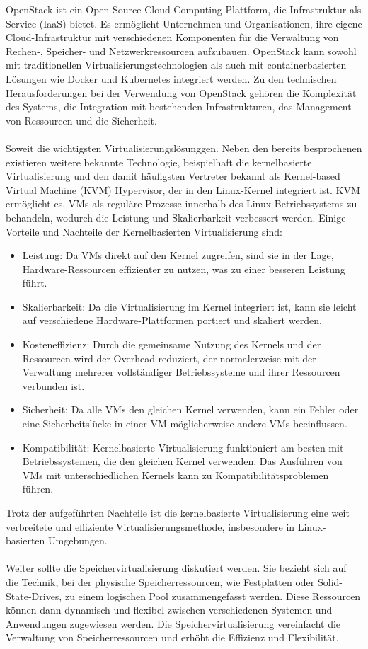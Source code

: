 OpenStack ist ein Open-Source-Cloud-Computing-Plattform, die Infrastruktur als Service (IaaS) bietet. Es ermöglicht Unternehmen und Organisationen, ihre eigene Cloud-Infrastruktur mit verschiedenen Komponenten für die Verwaltung von Rechen-, Speicher- und Netzwerkressourcen aufzubauen. OpenStack kann sowohl mit traditionellen Virtualisierungstechnologien als auch mit containerbasierten Lösungen wie Docker und Kubernetes integriert werden. Zu den technischen Herausforderungen bei der Verwendung von OpenStack gehören die Komplexität des Systems, die Integration mit bestehenden Infrastrukturen, das Management von Ressourcen und die Sicherheit.
\\\\
Soweit die wichtigsten Virtualisierungslösunggen. Neben den bereits besprochenen existieren weitere bekannte Technologie, beispielhaft die kernelbasierte Virtualisierung und den damit häufigsten Vertreter bekannt als Kernel-based Virtual Machine (KVM) Hypervisor, der in den Linux-Kernel integriert ist. KVM ermöglicht es, VMs als reguläre Prozesse innerhalb des Linux-Betriebssystems zu behandeln, wodurch die Leistung und Skalierbarkeit verbessert werden. Einige Vorteile und Nachteile der Kernelbasierten Virtualisierung sind:
\begin{itemize}
\item Leistung: Da VMs direkt auf den Kernel zugreifen, sind sie in der Lage, Hardware-Ressourcen effizienter zu nutzen, was zu einer besseren Leistung führt.
\item Skalierbarkeit: Da die Virtualisierung im Kernel integriert ist, kann sie leicht auf verschiedene Hardware-Plattformen portiert und skaliert werden.
\item Kosteneffizienz: Durch die gemeinsame Nutzung des Kernels und der Ressourcen wird der Overhead reduziert, der normalerweise mit der Verwaltung mehrerer vollständiger Betriebssysteme und ihrer Ressourcen verbunden ist.
\item Sicherheit: Da alle VMs den gleichen Kernel verwenden, kann ein Fehler oder eine Sicherheitslücke in einer VM möglicherweise andere VMs beeinflussen.
\item Kompatibilität: Kernelbasierte Virtualisierung funktioniert am besten mit Betriebssystemen, die den gleichen Kernel verwenden. Das Ausführen von VMs mit unterschiedlichen Kernels kann zu Kompatibilitätsproblemen führen.
\end{itemize}
Trotz der aufgeführten Nachteile ist die kernelbasierte Virtualisierung eine weit verbreitete und effiziente Virtualisierungsmethode, insbesondere in Linux-basierten Umgebungen.
\\\\
Weiter sollte die Speichervirtualisierung diskutiert werden. Sie bezieht sich auf die Technik, bei der physische Speicherressourcen, wie Festplatten oder Solid-State-Drives, zu einem logischen Pool zusammengefasst werden. Diese Ressourcen können dann dynamisch und flexibel zwischen verschiedenen Systemen und Anwendungen zugewiesen werden. Die Speichervirtualisierung vereinfacht die Verwaltung von Speicherressourcen und erhöht die Effizienz und Flexibilität.

